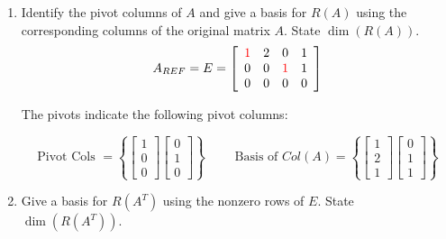\documentclass[9pt]{article}
\theoremstyle{plain}
\begin{document}
\begin{enumerate}
	      \[
		      E = \left[
			      \begin{array}{cccc}
				      1 & 2 & 0 & 1 \\
				      0 & 0 & 1 & 1 \\
				      0 & 0 & 0 & 0
			      \end{array}
			      \right] \quad
		      P = \left[
			      \begin{array}{ccc}
				      0 & 1  & -1 \\
				      0 & -1 & 2  \\
				      1 & -1 & 1
			      \end{array}
			      \right] \quad
		      r = 2
	      \]
	\item[(b)] Identify the pivot columns of $A$ and give a basis for $R(A)$ using the corresponding columns of the original matrix $A$. State $\dim(R(A))$.
	      \[
		      A_{REF} = E =
		      \left[
			      \begin{array}{cccc}
				      \color{red}{1} & 2 & 0              & 1 \\
				      0              & 0 & \color{red}{1} & 1 \\
				      0              & 0 & 0              & 0
			      \end{array}
			      \right]
	      \]
	      \begin{center} The {\color{red}pivots} indicate the following pivot columns: \end{center}
	      \[
		      \text{Pivot Cols } =
		      \left\{
		      \begin{bmatrix} 1 \\ 0 \\ 0 \end{bmatrix}
		      \begin{bmatrix} 0 \\ 1 \\ 0 \end{bmatrix}
		      \right\} \quad \quad
		      \text{ Basis of $Col(A)$} =
		      \left\{
		      \begin{bmatrix} 1 \\ 2 \\ 1 \end{bmatrix}
		      \begin{bmatrix} 0 \\ 1 \\ 1 \end{bmatrix}
		      \right\}
	      \]
	\item[(c)] Give a basis for $R(A^{T})$ using the nonzero rows of $E$. State $\dim(R(A^{T}))$.

\end{enumerate}
\end{document}

